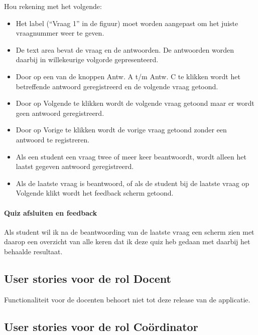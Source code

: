 \documentclass[11pt, a4paper]{article}
\begin{document}
Hou rekening met het volgende:
\begin{itemize}
\item Het label (``Vraag 1'' in de figuur) moet worden aangepast om het juiste vraagnummer weer te geven.

\item De text area bevat de vraag en de antwoorden.
De antwoorden worden daarbij in willekeurige volgorde gepresenteerd.

\item Door op een van de knoppen Antw. A t/m Antw. C te klikken wordt het betreffende antwoord geregistreerd en de volgende vraag getoond.

\item Door op Volgende te klikken wordt de volgende vraag getoond maar er wordt geen antwoord geregistreerd.

\item Door op Vorige te klikken wordt de vorige vraag getoond zonder een antwoord te registreren.

\item Als een student een vraag twee of meer keer beantwoordt, wordt alleen het laatst gegeven antwoord geregistreerd.

\item Als de laatste vraag is beantwoord, of als de student bij de laatste vraag op Volgende klikt wordt het feedback scherm getoond.

\end{itemize}

\paragraph{Quiz afsluiten en feedback}
Als student wil ik na de beantwoording van de laatste vraag een scherm zien met daarop een overzicht van alle keren dat ik deze quiz heb gedaan met daarbij het behaalde resultaat.

\subsection{User stories voor de rol Docent}

Functionaliteit voor de docenten behoort niet tot deze release van de applicatie.

\subsection{User stories voor de rol Co\"ordinator}
\end{document}
